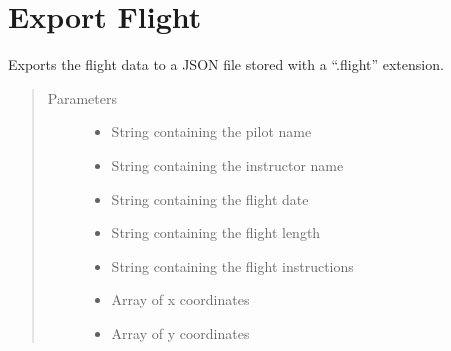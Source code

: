 \documentclass[letterpaper,10pt,english]{sphinxmanual}
\begin{document}
\chapter{Export Flight}
\label{\detokenize{index:module-src.Export.ExportFile}}\label{\detokenize{index:export-flight}}

\begin{fulllineitems}
\label{\detokenize{index:src.Export.ExportFile.export_data}}
Exports the flight data to a JSON file stored with a “.flight” extension.
\begin{quote}\begin{description}
\item[{Parameters}] \leavevmode\begin{itemize}
\item {} 
 \textendash{} String containing the pilot name

\item {} 
 \textendash{} String containing the instructor name

\item {} 
 \textendash{} String containing the flight date

\item {} 
 \textendash{} String containing the flight length

\item {} 
 \textendash{} String containing the flight instructions

\item {} 
 \textendash{} Array of x coordinates

\item {} 
 \textendash{} Array of y coordinates


\end{itemize}
\end{description}
\end{quote}
\end{fulllineitems}
\end{document}

